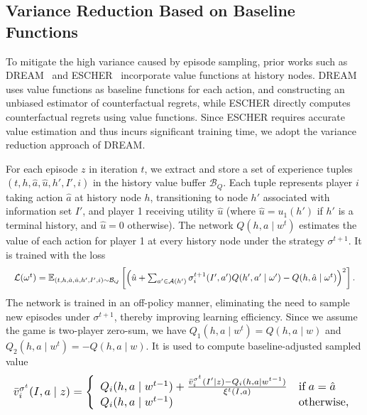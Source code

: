 \documentclass[letterpaper]{article} %
\makeatletter
\renewenvironment{align*}{%
  \linenomath 
  \start@align\@ne\st@rredtrue\m@ne
}{%
  \endalign
  \endlinenomath 
}
\makeatother
\begin{document}
\subsection{Variance Reduction Based on Baseline Functions}

To mitigate the high variance caused by episode sampling, prior works such as DREAM~\cite{steinberger2020dream} and ESCHER~\cite{ESCHER} incorporate value functions at history nodes. 
DREAM uses value functions as baseline functions for each action, and constructing an unbiased estimator of counterfactual regrets, while ESCHER directly computes counterfactual regrets using value functions.
Since ESCHER requires accurate value estimation and thus incurs significant training time, we adopt the variance reduction approach of DREAM.

For each episode $z$ in iteration $t$, we extract and store a set of experience tuples $(t, h, \hat{a}, \hat{u}, h', I', i)$ in the history value buffer $\mathcal{B}_Q$. Each tuple represents player $i$ taking action $\hat{a}$ at history node $h$, transitioning to node $h'$ associated with information set $I'$, and player 1 receiving utility $\hat{u}$ (where $\hat{u} = u_1(h')$ if $h'$ is a terminal history, and $\hat{u}=0$ otherwise).
The network $Q(h, a \mid w^t)$ estimates the value of each action for player 1 at every history node under the strategy $\sigma^{t+1}$. 
It is trained with the loss
\begin{align*}
    \resizebox{1\linewidth}{!}{$
\mathcal{L}(\omega^t) = \mathbb{E}_{(t, h, \hat{a}, \hat{u}, h', I', i)\sim \mathcal{B}_{Q}}\left[\left(\hat{u} + \sum_{a'\in \mathcal{A}(h')}^{}\sigma_i^{t+1}(I', a')Q(h', a' \mid \omega') - Q(h, \hat{a} \mid \omega^{t}) \right)^2\right].
    $}
\end{align*}
The network is trained in an off-policy manner, eliminating the need to sample new episodes under $\sigma^{t+1}$, thereby improving learning efficiency.
Since we assume the game is two-player zero-sum, we have $Q_1(h, a \mid w^t) = Q(h, a \mid w)$ and $Q_2(h, a \mid w^t) = -Q(h, a \mid w)$.
It is used to compute baseline-adjusted sampled value 
\begin{align*}
    \resizebox{1\linewidth}{!}{$
    \bar{v}_i^{\sigma^t}(I, a \mid z)  =  \left\{
        \begin{array}{ll}
         Q_i(h, a \mid w^{t-1} ) + \frac{\bar{v}_i^{\sigma^t}(I' \mid z) - Q_i(h, a \mid w^{t-1})}{\xi^t(I, a)} & \text{if}\;a=\hat{a}\\
         Q_i(h, a \mid w^{t-1} ) & \text{otherwise,}
        \end{array}
        \right.
    $}
\end{align*}
\end{document}
